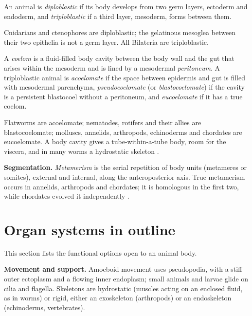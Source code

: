 \begin{definition}
\label{definition-germ-layers}
An animal is \emph{diploblastic} if its body
develops from two germ layers, ectoderm and
endoderm, and \emph{triploblastic} if a third
layer, mesoderm, forms between them.
\end{definition}

Cnidarians and ctenophores are diploblastic;
the gelatinous mesoglea between their two
epithelia is not a germ layer. All Bilateria
are triploblastic.

\begin{definition}
\label{definition-coelom}
A \emph{coelom} is a fluid-filled body cavity
between the body wall and the gut that arises
within the mesoderm and is lined by a
mesodermal \emph{peritoneum}. A triploblastic
animal is \emph{acoelomate} if the space
between epidermis and gut is filled with
mesodermal parenchyma, \emph{pseudocoelomate}
(or \emph{blastocoelomate}) if the cavity is
a persistent blastocoel without a peritoneum,
and \emph{eucoelomate} if it has a true
coelom.
\end{definition}

Flatworms are acoelomate; nematodes, rotifers
and their allies are blastocoelomate;
molluscs, annelids, arthropods, echinoderms
and chordates are eucoelomate. A body cavity
gives a tube-within-a-tube body, room for the
viscera, and in many worms a hydrostatic
skeleton \cite[Chapter 3]{hickman2002animal}.

\textbf{Segmentation.} \emph{Metamerism} is
the serial repetition of body units
(metameres or somites), external and
internal, along the anteroposterior axis.
True metamerism occurs in annelids,
arthropods and chordates; it is homologous in
the first two, while chordates evolved it
independently \cite[Chapter
3]{hickman2002animal}.

\section{Organ systems in outline}
\label{section-functions}

This section lists the
functional options open to an animal body.

\textbf{Movement and support.} Amoeboid
movement uses pseudopodia, with a stiff outer
ectoplasm and a flowing inner endoplasm;
small animals and larvae glide on cilia and
flagella. Skeletons are hydrostatic (muscles
acting on an enclosed fluid, as in worms) or
rigid, either an exoskeleton (arthropods) or
an endoskeleton (echinoderms, vertebrates).

